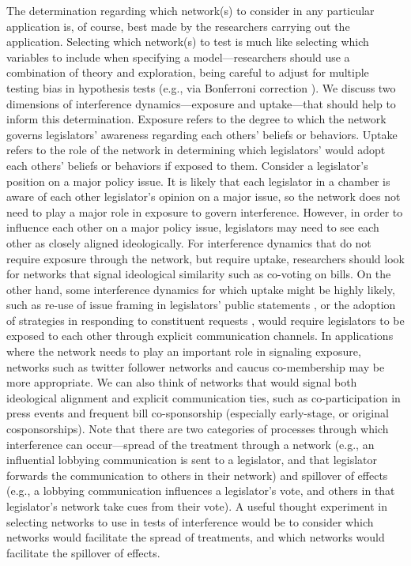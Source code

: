 \documentclass[12pt]{article}
\begin{document}
The determination regarding which network(s) to consider in any particular application is, of course, best made by the researchers carrying out the application. Selecting which network(s) to test is much like selecting which variables to include when specifying a model---researchers should use a combination of theory and exploration, being careful to adjust for multiple testing bias in hypothesis tests (e.g., via Bonferroni correction \citep{napierala2012bonferroni}). We discuss two dimensions of interference dynamics---exposure and uptake---that should help to inform this determination. Exposure refers to the degree to which the network governs legislators' awareness regarding each others' beliefs or behaviors. Uptake refers to the role of the network in determining which legislators' would adopt each others' beliefs or behaviors if exposed to them. Consider a legislator's position on a major policy issue. It is likely that each legislator in a chamber is aware of each other legislator's opinion on a major issue, so the network does not need to play a major role in exposure to govern interference. However, in order to influence each other on a major policy issue, legislators may need to see each other as closely aligned ideologically. For interference dynamics that do not require exposure through the network, but require uptake, researchers should look for networks that signal ideological similarity such as co-voting on bills. On the other hand, some interference dynamics for which uptake might be highly likely, such as re-use of issue framing in legislators' public statements \citep{lin2016uncovering}, or the adoption of strategies in responding to constituent requests \citep{grose2015explainin}, would require legislators to be exposed to each other through explicit communication channels.  In applications where the network needs to play an important role in signaling exposure, networks such as twitter follower networks and caucus co-membership may be more appropriate. We can also think of networks that would signal both ideological alignment and explicit communication ties, such as co-participation in press events and frequent bill co-sponsorship (especially early-stage, or original cosponsorships).  Note that there are two categories of processes through which interference can occur---spread of the treatment through a network (e.g., an influential lobbying communication is sent to a legislator, and that legislator forwards the communication to others in their network) and spillover of effects (e.g., a lobbying communication influences a legislator's vote, and others in that legislator's network take cues from their vote). A useful thought experiment in selecting networks to use in tests of interference would be to consider which networks would facilitate the spread of treatments, and which networks would facilitate the spillover of effects.
\end{document}
